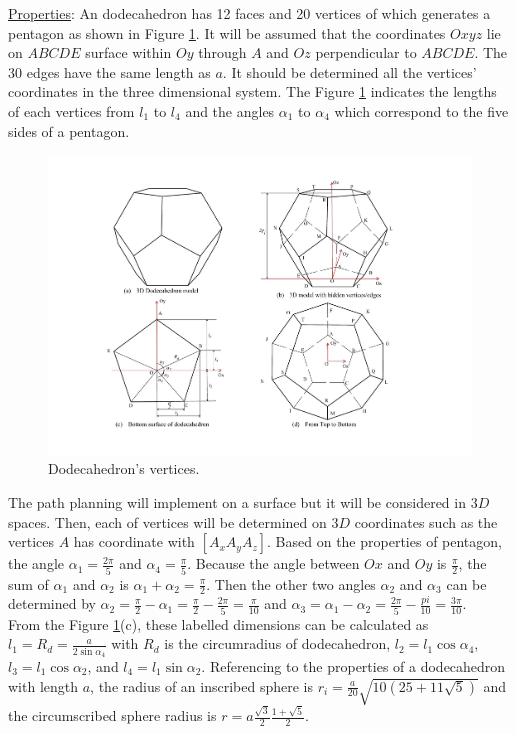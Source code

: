 \noindent\uline{Properties}: 
An dodecahedron has 12 faces and 20 vertices of which generates a pentagon as shown in Figure \ref{fig:dodecahedron2}.
It will be assumed that the coordinates $Oxyz$ lie on $ABCDE$ surface within $Oy$ through $A$ and $Oz$ perpendicular to $ABCDE$.
The 30 edges have the same length as $a$. It should be determined all the vertices' coordinates in the three dimensional system.
The Figure \ref{fig:dodecahedron2} indicates the lengths of each vertices from $l_1$ to $l_4$ and the angles $\alpha_1$ to $\alpha_4$ which correspond to the five sides of a pentagon.

\begin{figure}[h]
\centering
	\includegraphics[width=1\textwidth]{image/dodecahedron2.pdf}
	\caption{Dodecahedron's vertices.}
	\label{fig:dodecahedron2}
\end{figure}

\noindent The path planning will implement on a surface but it will be considered in $3D$ spaces. Then, each of vertices will be determined on $3D$ coordinates such as the vertices $A$ has coordinate with $[A_x A_y A_z]$. Based on the properties of pentagon, the angle $\alpha_1=\frac{2\pi}{5}$ and $\alpha_4=\frac{\pi}{5}$. Because the angle between $Ox$ and $Oy$ is $\frac{\pi}{2}$, the sum of $\alpha_1$ and $\alpha_2$ is $\alpha_1 + \alpha_2 = \frac{\pi}{2}$. Then the other two angles $\alpha_2$ and $\alpha_3$ can be determined by $\alpha_2 = \frac{\pi}{2}-\alpha_1 = \frac{\pi}{2}-\frac{2\pi}{5} = \frac{\pi}{10}$ and $\alpha_3 = \alpha_1-\alpha_2 = \frac{2\pi}{5}-\frac{pi}{10} = \frac{3\pi}{10}$.\\

\noindent From the Figure \ref{fig:dodecahedron2}(c), these labelled dimensions can be calculated as $l_1 = R_d = \frac{a}{2\sin{\alpha_4}}$ with $R_d$ is the circumradius of dodecahedron, $l_2 = l_1\cos{\alpha_4}$, $l_3 = l_1\cos{\alpha_2}$, and $l_4 = l_1\sin{\alpha_2}$. Referencing to the properties of a dodecahedron with length $a$, the radius of an inscribed sphere is $r_i = \frac{a}{20}\sqrt{10(25+11\sqrt{5})}$ and the circumscribed sphere radius is $r = a\frac{\sqrt{3}}{2}\frac{1+\sqrt{5}}{2}$.\\

